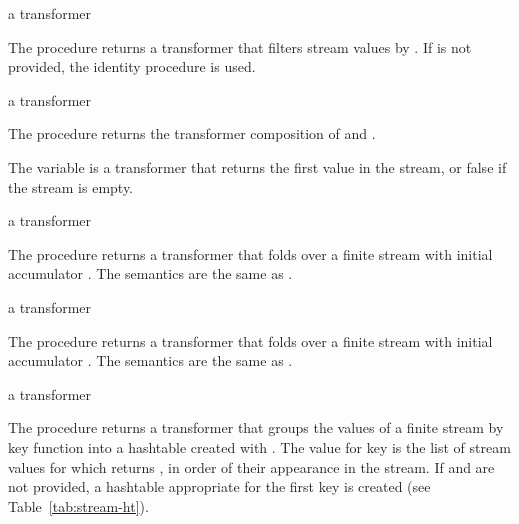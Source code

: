 \begin{procedure}
\end{procedure}
\returns{} a transformer

The  procedure returns a transformer that filters stream values by
. If  is not provided, the identity procedure is used.

\begin{procedure}
\end{procedure}
\returns{} a transformer

The  procedure returns the transformer composition of  and .

\begin{variable}
\end{variable}
\antipar

The  variable is a transformer that returns the first value in the stream, or
false if the stream is empty.

\begin{procedure}
\end{procedure}
\returns{} a transformer

The  procedure returns a transformer that folds  over a
finite stream with initial accumulator . The semantics are the same as
.

\begin{procedure}
\end{procedure}
\returns{} a transformer

The  procedure returns a transformer that folds  over a
finite stream with initial accumulator . The semantics are the same as
.

\begin{procedure}
\end{procedure}
\returns{} a transformer

The  procedure returns a transformer that groups the values of a finite
stream by key function  into a hashtable created with . The value for key  is the list of stream values for
which  returns , in order of their appearance in the stream. If
 and  are not provided, a hashtable appropriate for the first key is
created (see Table~\ref{tab:stream-ht}).

